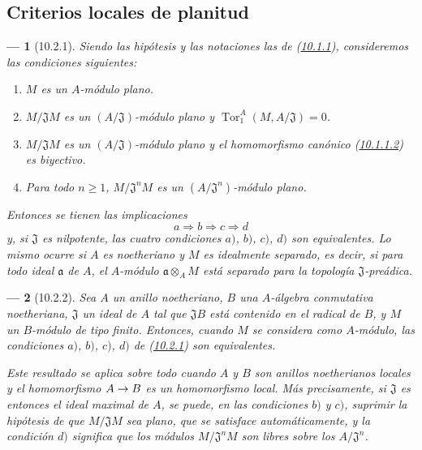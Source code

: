\documentclass[10pt,oneside,openany]{book}
\theoremstyle{egaenv}\newtheorem*{env}{---}
\theoremstyle{egastatement}
\theoremstyle{egadescription}
\newcommand{\oldpage}[2][]{\marginnote{\normalfont\scriptsize\textbf{#1}\,|\,#2}\ignorespaces}
\renewcommand{\geq}{\geqslant}
\renewcommand{\to}{\mathchoice{\longrightarrow}{\rightarrow}{\rightarrow}{\rightarrow}}
\begin{document}
\subsection{Criterios locales de planitud}
\label{subsection:0.10.2}
\label{subsection:0.10.2-fr}

\begin{env}[10.2.1]
\label{0.10.2.1-fr}
Siendo las hipótesis y las notaciones las de (\hyperref[0.10.1.1-fr]{10.1.1}), consideremos las condiciones siguientes:
\begin{enumerate}
  \item[$a)$] $M$ es un $A$-módulo plano.
  \item[$b)$] $M/\mathfrak{J}M$ es un $(A/\mathfrak{J})$-módulo plano y $\operatorname{Tor}_1^A(M,A/\mathfrak{J})=0$.
  \item[$c)$] $M/\mathfrak{J}M$ es un $(A/\mathfrak{J})$-módulo plano y el homomorfismo canónico (\hyperref[0.10.1.1.2-fr]{10.1.1.2}) es biyectivo.
  \item[$d)$] Para todo $n\geq1$, $M/\mathfrak{J}^nM$ es un $(A/\mathfrak{J}^n)$-módulo plano.
\end{enumerate}

Entonces se tienen las implicaciones
\[
  a\Rightarrow b\Rightarrow c\Rightarrow d
\]
y, si $\mathfrak{J}$ es \emph{nilpotente}, las cuatro condiciones $a)$, $b)$, $c)$, $d)$ son \emph{equivalentes}. Lo mismo ocurre si $A$ es noetheriano y $M$ es \emph{idealmente separado}, es decir, si para todo ideal $\mathfrak{a}$ de $A$, el $A$-módulo $\mathfrak{a}\otimes_A M$ está \emph{separado} para la topología $\mathfrak{J}$-preádica.
\end{env}

\begin{env}[10.2.2]
\label{0.10.2.2}
\label{0.10.2.2-fr}
Sea $A$ un anillo noetheriano, $B$ una $A$-álgebra conmutativa noetheriana, $\mathfrak{J}$ un ideal de $A$ tal que $\mathfrak{J}B$ está contenido en el radical de $B$, y $M$ un $B$-\emph{módulo} de tipo finito.
Entonces, cuando $M$ se considera como $A$-\emph{módulo}, las condiciones $a)$, $b)$, $c)$, $d)$ de (\hyperref[0.10.2.1-fr]{10.2.1}) son \emph{equivalentes}.

\oldpage[0\textsubscript{III}]{19}
Este resultado se aplica sobre todo cuando $A$ y $B$ son anillos noetherianos \emph{locales} y el homomorfismo $A\to B$ es un homomorfismo \emph{local}.
Más precisamente, si $\mathfrak{J}$ es entonces el ideal \emph{maximal} de $A$, se puede, en las condiciones $b)$ y $c)$, suprimir la hipótesis de que $M/\mathfrak{J}M$ sea plano, que se satisface automáticamente, y la condición $d)$ significa que los módulos $M/\mathfrak{J}^nM$ son \emph{libres} sobre los $A/\mathfrak{J}^n$.
\end{env}
\end{document}
